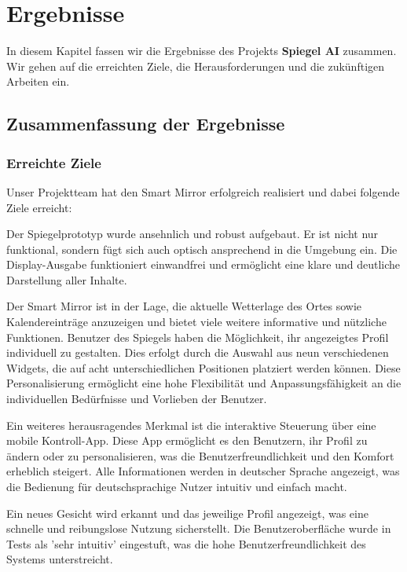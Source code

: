 \chapter{Ergebnisse}

In diesem Kapitel fassen wir die Ergebnisse des Projekts \textbf{Spiegel AI} zusammen. Wir gehen auf die erreichten Ziele, die Herausforderungen und die zukünftigen Arbeiten ein.

\section{Zusammenfassung der Ergebnisse}

\subsection{Erreichte Ziele}
Unser Projektteam hat den Smart Mirror erfolgreich realisiert und dabei folgende Ziele erreicht:

Der Spiegelprototyp wurde ansehnlich und robust aufgebaut. Er ist nicht nur funktional, sondern fügt sich auch optisch ansprechend in die Umgebung ein. Die Display-Ausgabe funktioniert einwandfrei und ermöglicht eine klare und deutliche Darstellung aller Inhalte.

Der Smart Mirror ist in der Lage, die aktuelle Wetterlage des Ortes sowie Kalendereinträge anzuzeigen und bietet viele weitere informative und nützliche Funktionen. Benutzer des Spiegels haben die Möglichkeit, ihr angezeigtes Profil individuell zu gestalten. Dies erfolgt durch die Auswahl aus neun verschiedenen Widgets, die auf acht unterschiedlichen Positionen platziert werden können. Diese Personalisierung ermöglicht eine hohe Flexibilität und Anpassungsfähigkeit an die individuellen Bedürfnisse und Vorlieben der Benutzer.

Ein weiteres herausragendes Merkmal ist die interaktive Steuerung über eine mobile Kontroll-App. Diese App ermöglicht es den Benutzern, ihr Profil zu ändern oder zu personalisieren, was die Benutzerfreundlichkeit und den Komfort erheblich steigert. Alle Informationen werden in deutscher Sprache angezeigt, was die Bedienung für deutschsprachige Nutzer intuitiv und einfach macht.

Ein neues Gesicht wird erkannt und das jeweilige Profil angezeigt, was eine schnelle und reibungslose Nutzung sicherstellt. Die Benutzeroberfläche wurde in Tests als 'sehr intuitiv' eingestuft, was die hohe Benutzerfreundlichkeit des Systems unterstreicht.

